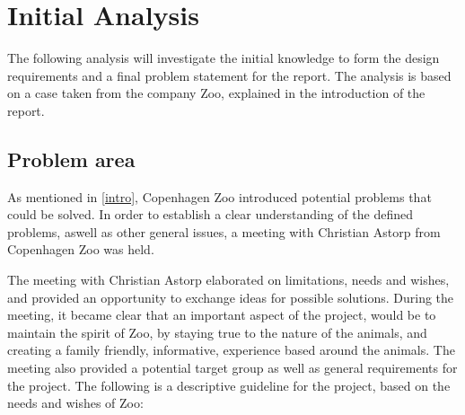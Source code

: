 \chapter{Initial Analysis}\label{chap:analysis}
The following analysis will investigate the initial knowledge to form the design requirements and a final problem statement for the report. The analysis is based on a case taken from the company Zoo, explained in the introduction of the report.



\section{Problem area}\label{problemArea}
As mentioned in \autoref{intro}, Copenhagen Zoo introduced potential problems that could be solved. In order to establish a clear understanding of the defined problems, aswell as other general issues, a meeting with Christian Astorp from Copenhagen Zoo was held.

The meeting with Christian Astorp  elaborated on limitations, needs and wishes, and provided an opportunity to exchange ideas for possible solutions. During the meeting, it became clear that an important aspect of the project, would be to maintain the spirit of Zoo, by staying true to the nature of the animals, and creating a family friendly, informative, experience based around the animals. The meeting also provided a potential target group as well as general requirements for the project.
The following is a descriptive guideline for the project, based on the needs and wishes of Zoo:   \\

